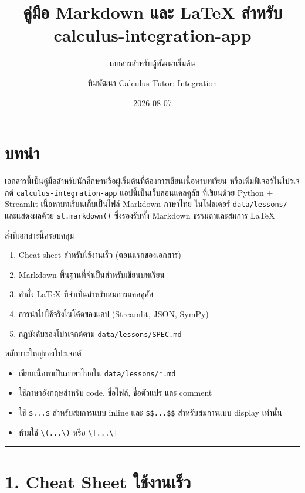 \documentclass[
  thai,
  12pt,
  letterpaper,
  DIV=11,
  numbers=noendperiod]{scrartcl}
\title{คู่มือ Markdown และ LaTeX สำหรับ calculus-integration-app}
\subtitle{เอกสารสำหรับผู้พัฒนาเริ่มต้น}
\author{ทีมพัฒนา Calculus Tutor: Integration}
\date{2026-08-07}
\providecommand{\tightlist}{%
  \setlength{\itemsep}{0pt}\setlength{\parskip}{0pt}}
\begin{document}
\maketitle


\section{บทนำ}\label{uxe1auxe17uxe19uxe33}

เอกสารนี้เป็นคู่มือสำหรับนักศึกษาหรือผู้เริ่มต้นที่ต้องการเขียนเนื้อหาบทเรียน
หรือเพิ่มฟีเจอร์ในโปรเจกต์ \texttt{calculus-integration-app}
แอปนี้เป็นเว็บสอนแคลคูลัส ที่เขียนด้วย Python + Streamlit เนื้อหาบทเรียนเก็บเป็นไฟล์
Markdown ภาษาไทย ในโฟลเดอร์ \texttt{data/lessons/} และแสดงผลด้วย
\texttt{st.markdown()} ซึ่งรองรับทั้ง Markdown ธรรมดาและสมการ LaTeX

สิ่งที่เอกสารนี้ครอบคลุม

\begin{enumerate}
\def\labelenumi{\arabic{enumi}.}
\tightlist
\item
  Cheat sheet สำหรับใช้งานเร็ว (ตอนแรกของเอกสาร)
\item
  Markdown พื้นฐานที่จำเป็นสำหรับเขียนบทเรียน
\item
  คำสั่ง LaTeX ที่จำเป็นสำหรับสมการแคลคูลัส
\item
  การนำไปใช้จริงในโค้ดของแอป (Streamlit, JSON, SymPy)
\item
  กฎบังคับของโปรเจกต์ตาม \texttt{data/lessons/SPEC.md}
\end{enumerate}

หลักการใหญ่ของโปรเจกต์

\begin{itemize}
\tightlist
\item
  เขียนเนื้อหาเป็นภาษาไทยใน \texttt{data/lessons/*.md}
\item
  ใช้ภาษาอังกฤษสำหรับ code, ชื่อไฟล์, ชื่อตัวแปร และ comment
\item
  ใช้ \texttt{\$...\$} สำหรับสมการแบบ inline และ \texttt{\$\$...\$\$}
  สำหรับสมการแบบ display เท่านั้น
\item
  ห้ามใช้ \texttt{\textbackslash{}(...\textbackslash{})} หรือ
  \texttt{\textbackslash{}{[}...\textbackslash{}{]}}
\end{itemize}

\begin{center}\rule{0.5\linewidth}{0.5pt}\end{center}

\section{1. Cheat Sheet
ใช้งานเร็ว}\label{cheat-sheet-uxe43uxe0auxe07uxe32uxe19uxe40uxe23uxe27}
\end{document}
